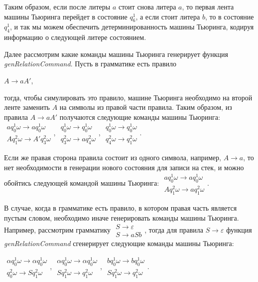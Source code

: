 \documentclass[14pt]{matmex-diploma-custom}
\begin{document}
Таким образом, если после литеры $a$ стоит снова литера $a$, то первая лента машины Тьюринга перейдет в состояние $q_6^1$, а если стоит литера $b$, то в состояние $q_4^1$, и так мы можем обеспечить детерминированность машины Тьюринга, кодируя информацию о следующей литере состоянием. 

Далее рассмотрим какие команды машины Тьюринга генерирует функция \textit{genRelationCommand}.
Пусть в грамматике есть правило 

$A \to a A'$, 

тогда, чтобы симулировать это правило, машине Тьюринга
необходимо на второй ленте заменить $A$ на символы из правой части правила. Таким образом, из правила $A \to a A'$ получаются 
следующие команды машины Тьюринга: 
$\begin{array}{lcl}
    a q_0^1 \omega \to a q_0^1 \omega \\
    A q_1^2 \omega \to A' q_3^2 \omega 
\end{array}$,
$\begin{array}{lcl}
    q_0^1 \omega \to q_0^1 \omega \\
    q_3^2 \omega \to a q_4^2 \omega 
\end{array}$,
$\begin{array}{lcl}
    q_0^1 \omega \to q_0^1 \omega \\
    q_4^2 \omega \to q_1^2 \omega 
\end{array}$. 

Если же правая сторона правила состоит из одного символа, например, $A \to a$, то нет необходимости в генерации нового состояния для записи на стек, и можно обойтись следующей командой машины Тьюринга: 
$\begin{array}{lcl}
    a q_0^1 \omega \to a q_0^1 \omega \\
    A q_1^2 \omega \to a q_1^2 \omega 
\end{array}$. 

В случае, когда в грамматике есть правило, в котором правая часть является пустым словом, необходимо иначе генерировать команды машины Тьюринга. Например, рассмотрим грамматику 
$\begin{array}{lcl}
    S \to \varepsilon \\
    S \to a S b
\end{array}$, тогда для правила $S \to \varepsilon$ функция \textit{genRelationCommand} сгенерирует следующие команды машины Тьюринга:

$\begin{array}{lcl}
    \alpha q_0^1 \omega \to \alpha q_0^1 \omega \\
    q_0^2 \omega \to S q_1^2 \omega 
\end{array}$,
$\begin{array}{lcl}
    \alpha q_0^1 \omega \to \alpha q_0^1 \omega \\
    S q_1^2 \omega \to q_1^2 \omega 
\end{array}$,
$\begin{array}{lcl}
    b q_0^1 \omega \to b q_0^1 \omega \\
    S q_1^2 \omega \to q_1^2 \omega 
\end{array}$.
\end{document}
